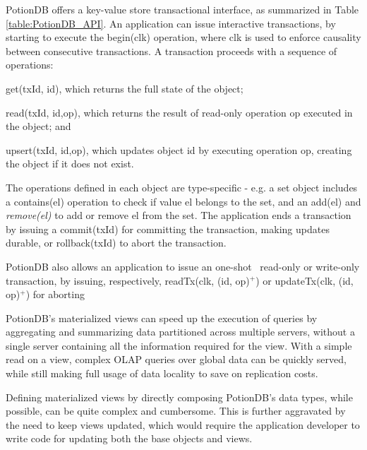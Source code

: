 \documentclass[sigconf, nonacm]{acmart}
\newcommand{\code}[1]{\textsf{\small{#1}}}
\begin{document}
PotionDB offers a key-value store transactional interface, as summarized in Table \ref{table:PotionDB_API}.
An application can issue interactive transactions, by starting to execute the \code{begin(clk)} operation,
where \code{clk} is used to enforce causality between consecutive transactions.
A transaction proceeds with a sequence of operations: 
\begin{inparaenum}[(i)] 
\item \code{get(txId, id)}, which returns the full state of the object;
\item \code{read(txId, id,op)}, which returns the result of read-only operation \code{op} executed in the object; and
\item \code{upsert(txId, id,op)}, which updates object \code{id} by executing operation \code{op}, creating the object if it does not exist.
\end{inparaenum}
The operations defined in each object are type-specific - e.g. a set object includes a \code{contains(el)} operation to check
if value \code{el} belongs to the set, and an \code{add(el)} and \emph{remove(el)} to add or remove \code{el} from the set.
The application ends a transaction by issuing a \code{commit(txId)} for committing the transaction, making updates durable,  or \code{rollback(txId)} to abort the transaction.

PotionDB also allows an application to issue an one-shot~\cite{} read-only or write-only transaction,
by issuing, respectively, \code{readTx(clk, (id, op)$^+$)} or \code{updateTx(clk, (id, op)$^+$)}
for aborting 

PotionDB's materialized views can speed up the execution of queries by aggregating and  summarizing data partitioned across multiple servers, without a single server containing all the information required for the view.
With a simple read on a view, complex OLAP queries over global data can be quickly served, while still making full usage of data locality to save on replication costs.

Defining materialized views by directly composing PotionDB's data types, while possible, can be quite complex and cumbersome.
This is further aggravated by the need to keep views updated, which would require the application developer to write code for updating both the base objects and views.
\end{document}
